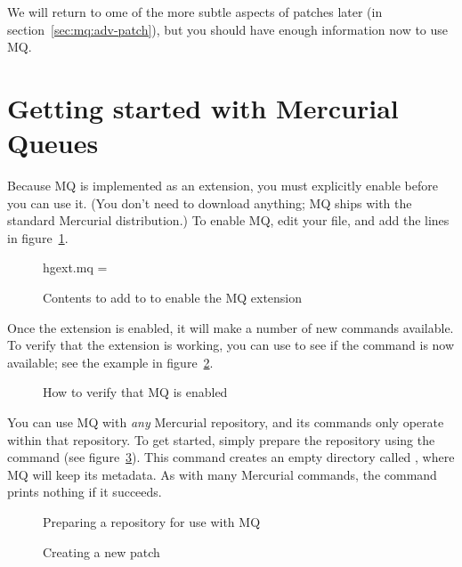 We will return to ome of the more subtle aspects of patches later (in
section~\ref{sec:mq:adv-patch}), but you should have enough information
now to use MQ.

\section{Getting started with Mercurial Queues}
\label{sec:mq:start}

Because MQ is implemented as an extension, you must explicitly enable
before you can use it.  (You don't need to download anything; MQ ships
with the standard Mercurial distribution.)  To enable MQ, edit your
 file, and add the lines in figure~\ref{ex:mq:config}.

\begin{figure}[ht]
  \begin{codesample4}
    [extensions]
    hgext.mq =
  \end{codesample4}
  \label{ex:mq:config}
  \caption{Contents to add to  to enable the MQ extension}
\end{figure}

Once the extension is enabled, it will make a number of new commands
available.  To verify that the extension is working, you can use
 to see if the  command is now available; see
the example in figure~\ref{ex:mq:enabled}.

\begin{figure}[ht]
  \caption{How to verify that MQ is enabled}
  \label{ex:mq:enabled}
\end{figure}

You can use MQ with \emph{any} Mercurial repository, and its commands
only operate within that repository.  To get started, simply prepare
the repository using the  command (see
figure~\ref{ex:mq:qinit}).  This command creates an empty directory
called , where MQ will keep its metadata.  As
with many Mercurial commands, the  command prints nothing
if it succeeds.

\begin{figure}[ht]
  \caption{Preparing a repository for use with MQ}
  \label{ex:mq:qinit}
\end{figure}

\begin{figure}[ht]
  \caption{Creating a new patch}
  \label{ex:mq:qnew}
\end{figure}

